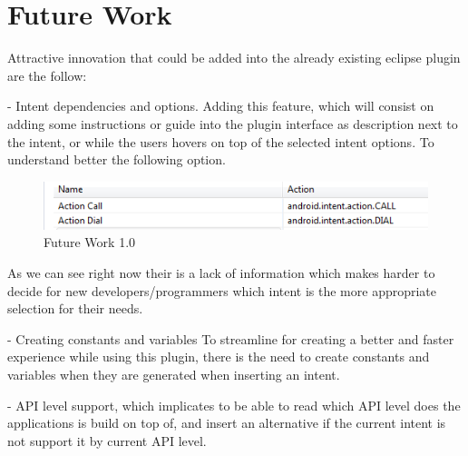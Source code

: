 \section{Future Work}
Attractive innovation that could be added into the already existing eclipse plugin are the follow:

- Intent dependencies and options.
	Adding this feature, which will consist on adding some instructions or guide into the plugin interface as description next to the intent, or while the users hovers on top of the selected intent options. To understand better the following option. 

\begin{figure}[H]
\label{codegeneratorview}
  \centering
    \includegraphics[width=\textwidth]{intentBefore}
  \caption{Future Work 1.0}
\end{figure}

	As we can see right now their is a lack of information which makes harder to decide for new developers/programmers which intent is the more appropriate selection for their needs.

- Creating constants and variables
	To streamline for creating a better and faster experience while using this plugin, there is the need to create constants and variables when they are generated when inserting an intent.

- API level support, which implicates to be able to read which API level does the applications is build on top of, and insert an alternative if the current intent is not support it by current API level.
	